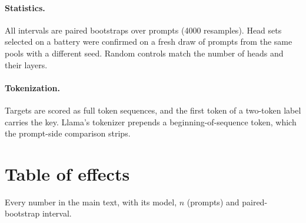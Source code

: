 \documentclass{article}
\begin{document}
\paragraph{Statistics.} All intervals are paired bootstraps over prompts (4000 resamples). Head sets selected on a battery were confirmed on a fresh draw of prompts from the same pools with a different seed. Random controls match the number of heads and their layers.
\paragraph{Tokenization.} Targets are scored as full token sequences, and the first token of a two-token label carries the key. Llama's tokenizer prepends a beginning-of-sequence token, which the prompt-side comparison strips.

\section{Table of effects}\label{app:claims}
Every number in the main text, with its model, $n$ (prompts) and paired-bootstrap interval.
\end{document}
